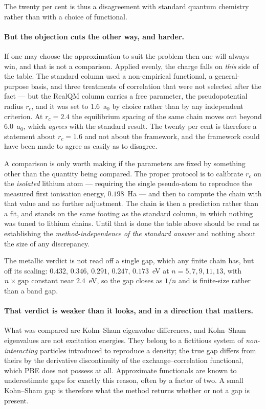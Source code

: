 \documentclass[11pt]{article}
\begin{document}
\noindent The twenty per cent is thus a disagreement with standard quantum chemistry rather than
with a choice of functional.

\paragraph{But the objection cuts the other way, and harder.} If one may choose the approximation to
suit the problem then one will always win, and that is not a comparison. Applied evenly, the charge
falls on \emph{this} side of the table. The standard column used a non-empirical functional, a
general-purpose basis, and three treatments of correlation that were not selected after the fact ---
but the RealQM column carries a free parameter, the pseudopotential radius $r_c$, and it was set to
$1.6$~a$_0$ by choice rather than by any independent criterion. At $r_c=2.4$ the equilibrium spacing
of the same chain moves out beyond $6.0$~a$_0$, which \emph{agrees} with the standard result. The
twenty per cent is therefore a statement about $r_c=1.6$ and not about the framework, and the
framework could have been made to agree as easily as to disagree.

A comparison is only worth making if the parameters are fixed by something other than the quantity
being compared. The proper protocol is to calibrate $r_c$ on the \emph{isolated} lithium atom ---
requiring the single pseudo-atom to reproduce the measured first ionisation energy,
$0.198$~Ha --- and then to compute the chain with that value and no further adjustment. The chain is
then a prediction rather than a fit, and stands on the same footing as the standard column, in which
nothing was tuned to lithium chains. Until that is done the table above should be read as
establishing the \emph{method-independence of the standard answer} and nothing about the size of any
discrepancy.

\noindent The metallic verdict is not read off a single gap, which any finite chain has, but off its
scaling: $0.432$, $0.346$, $0.291$, $0.247$, $0.173$~eV at $n=5,7,9,11,13$, with $n\times{\rm gap}$
constant near $2.4$~eV, so the gap closes as $1/n$ and is finite-size rather than a band gap.

\paragraph{That verdict is weaker than it looks, and in a direction that matters.} What was compared
are Kohn--Sham eigenvalue differences, and Kohn--Sham eigenvalues are not excitation energies. They
belong to a fictitious system of \emph{non-interacting} particles introduced to reproduce a density;
the true gap differs from theirs by the derivative discontinuity of the exchange--correlation
functional, which PBE does not possess at all. Approximate functionals are known to underestimate
gaps for exactly this reason, often by a factor of two. A small Kohn--Sham gap is therefore what the
method returns whether or not a gap is present.
\end{document}
